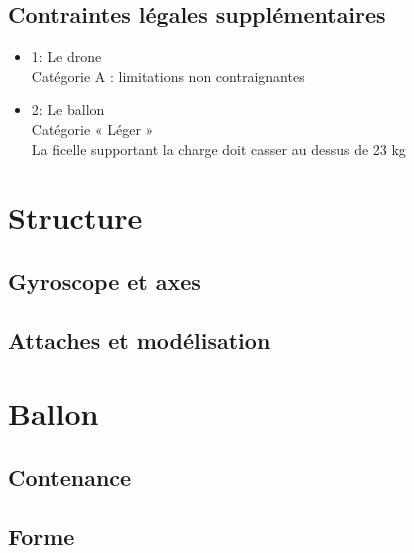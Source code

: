 \documentclass{beamer}
\begin{document}
\subsection{Contraintes légales supplémentaires}
\begin{frame}
  \begin{itemize}
    \item 1: Le drone \\
	    Catégorie A : limitations non contraignantes
    \item 2: Le ballon \\
	    Catégorie « Léger » \\
	    La ficelle supportant la charge doit casser au dessus de 23 kg
 \end{itemize}
\end{frame}


\section{Structure}

\subsection{Gyroscope et axes}

\begin{frame}
  
\end{frame}

\subsection{Attaches et modélisation}

\section{Ballon}

\subsection{Contenance}

\subsection{Forme}
\end{document}
